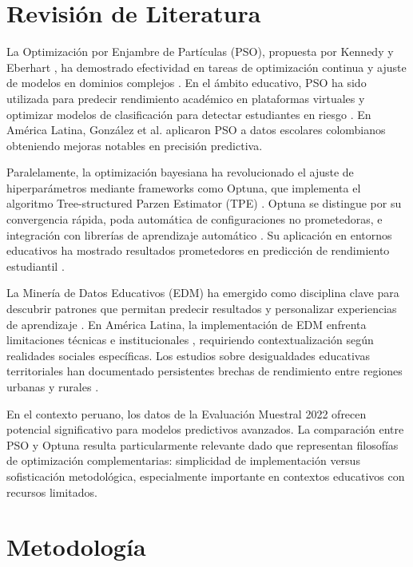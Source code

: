 \documentclass[conference]{IEEEtran}
\begin{document}
\section{Revisión de Literatura}

La Optimización por Enjambre de Partículas (PSO), propuesta por Kennedy y Eberhart \cite{kennedy1995particle}, ha demostrado efectividad en tareas de optimización continua y ajuste de modelos en dominios complejos \cite{liu2020improved}. En el ámbito educativo, PSO ha sido utilizada para predecir rendimiento académico en plataformas virtuales \cite{zhang2021learning} y optimizar modelos de clasificación para detectar estudiantes en riesgo \cite{sultana2021pso}. En América Latina, González et al. \cite{gonzalez2023edmcolombia} aplicaron PSO a datos escolares colombianos obteniendo mejoras notables en precisión predictiva.

Paralelamente, la optimización bayesiana ha revolucionado el ajuste de hiperparámetros mediante frameworks como Optuna, que implementa el algoritmo Tree-structured Parzen Estimator (TPE) \cite{akiba2019optuna}. Optuna se distingue por su convergencia rápida, poda automática de configuraciones no prometedoras, e integración con librerías de aprendizaje automático \cite{feurer2019hyperparameter}. Su aplicación en entornos educativos ha mostrado resultados prometedores en predicción de rendimiento estudiantil \cite{yang2022optunaed}.

La Minería de Datos Educativos (EDM) ha emergido como disciplina clave para descubrir patrones que permitan predecir resultados y personalizar experiencias de aprendizaje \cite{romero2020educational, baker2014educational}. En América Latina, la implementación de EDM enfrenta limitaciones técnicas e institucionales \cite{pena2014educational}, requiriendo contextualización según realidades sociales específicas. Los estudios sobre desigualdades educativas territoriales han documentado persistentes brechas de rendimiento entre regiones urbanas y rurales \cite{williamson2020datafication}.

En el contexto peruano, los datos de la Evaluación Muestral 2022 \cite{minedu2022em} ofrecen potencial significativo para modelos predictivos avanzados. La comparación entre PSO y Optuna resulta particularmente relevante dado que representan filosofías de optimización complementarias: simplicidad de implementación versus sofisticación metodológica, especialmente importante en contextos educativos con recursos limitados.

\section{Metodología}
\end{document}
